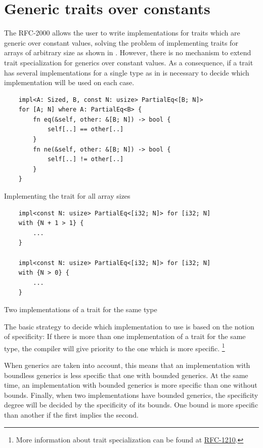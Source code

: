 \section{Generic traits over constants}

The RFC-2000 allows the user to write implementations for traits which are
generic over constant values, solving the problem of implementing traits for
arrays of arbitrary size as shown in . However,
there is no mechanism to extend trait specialization for generics over constant
values. As a consequence, if a trait has several implementations for a single
type as in  is necessary to decide which
implementation will be used on each case. 

\begin{listing}[h]
	\begin{verbatim}
    impl<A: Sized, B, const N: usize> PartialEq<[B; N]> 
    for [A; N] where A: PartialEq<B> {
        fn eq(&self, other: &[B; N]) -> bool {
            self[..] == other[..]
        }
        fn ne(&self, other: &[B; N]) -> bool {
            self[..] != other[..]
        }
    }
	\end{verbatim}
    \caption{Implementing the  trait for all array sizes}
  \label{lst:trait_const_generics}
\end{listing}

\begin{listing}[h]
	\begin{verbatim}
    impl<const N: usize> PartialEq<[i32; N]> for [i32; N]
    with {N + 1 > 1} {
        ...
    }
   
    impl<const N: usize> PartialEq<[i32; N]> for [i32; N]
    with {N > 0} {
        ...
    }
	\end{verbatim}
    \caption{Two implementations of a trait for the same type}
  \label{lst:trait_const_generics_spec}
\end{listing}

The basic strategy to decide which implementation to use is based on the notion
of specificity: If there is more than one implementation of a trait for the
same type, the compiler will give priority to the one which is more specific.
\footnote{More information about trait specialization can be found at
\href{https://github.com/rust-lang/rfcs/blob/master/text/1210-impl-specialization.md}{RFC-1210}.}

When generics are taken into account, this means that an implementation with
boundless generics is less specific that one with bounded generics. At the same
time, an implementation with bounded generics is more specific than one without
bounds. Finally, when two implementations have bounded generics, the
specificity degree will be decided by the specificity of its bounds. One bound
is more specific than another if the first implies the second.


